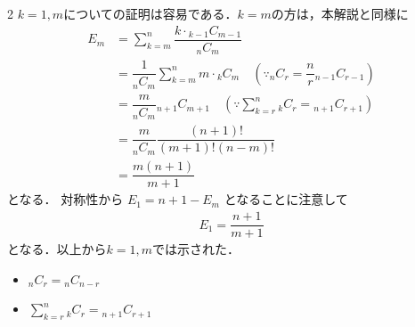 \documentclass[../../main.tex]{subfiles}
\begin{document}
\begin{multicols}{2}
  $k=1, m$についての証明は容易である．$k=m$の方は，本解説と同様に
  \begin{align}
    E_{m}
    & = \sum_{k=m}^n \dfrac{k \cdot {}_{k-1}C_{m-1}}{{}_n C_m} \\
    & = \dfrac{1}{{}_n C_m} \sum_{k=m}^n m \cdot {}_{k}C_{m} \quad (\because {}_n C_r = \dfrac{n}{r} {}_{n-1} C_{r-1}) \\
    & = \dfrac{m}{{}_n C_m} {}_{n+1}C_{m+1} \quad (\because \sum_{k=r}^n {}_k C_r =  {}_{n+1} C_{r+1})       \\
    & = \dfrac{m}{{}_n C_m} \dfrac{(n+1)!}{(m+1)!(n-m)!} \\
    & = \dfrac{m(n+1)}{m+1}
  \end{align}
  となる．
  対称性から $E_{1} = n+1-E_{m}$ となることに注意して
  \begin{align}
    E_{1} = \dfrac{n+1}{m+1}
  \end{align}
  となる．以上から$k=1,m$では示された．



  \begin{itemize}
    \item ${}_n C_r = {}_{n} C_{n-r}$
    \item $\sum_{k=r}^n {}_k C_r = {}_{n+1} C_{r+1}$
  \end{itemize}

  \newpage
\end{multicols}
\end{document}
